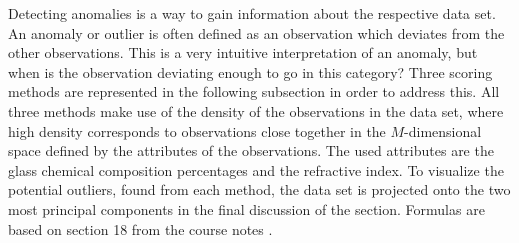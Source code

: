 Detecting anomalies is a way to gain information about the respective data set. An anomaly or outlier is often defined as an observation which deviates from the other observations. This is a very intuitive interpretation of an anomaly, but when is the observation deviating enough to go in this category? Three scoring methods are represented in the following subsection in order to address this. All three methods make use of the density of the observations in the data set, where high density corresponds to observations close together in the $M$-dimensional space defined by the attributes of the observations. The used attributes are the glass chemical composition percentages and the refractive index. To visualize the potential outliers, found from each method, the data set is projected onto the two most principal components in the final discussion of the section. Formulas are based on section 18 from the course notes \cite{coursenotes}. 